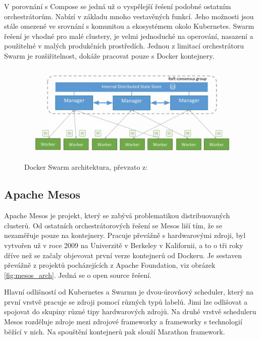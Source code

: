 V porovnání s Compose se jedná už o vyspělejší řešení podobné ostatním orchestrátorům. Nabízí v základu mnoho vestavěných funkcí. Jeho možnosti jsou stále omezené ve srovnání s komunitou a ekosystémem okolo Kubernetes. Swarm řešení je vhodné pro malé clustery, je velmi jednoduché na operování, nasazení a použitelné v malých produkčních prostředích. Jednou z limitací  orchestrátoru Swarm je rozšiřitelnost, dokáže pracovat pouze s Docker kontejnery. 


\begin{figure}[H]
\begin{centering}
\includegraphics[width=1\textwidth]{img/swarm_arch}
\par\end{centering}
\caption{Docker Swarm architektura, převzato z: \cite{swarm_arch} \label{fig:swarm_arch}}
\end{figure}

\subsection{Apache Mesos}
Apache Mesos je projekt, který se zabývá problematikou distribuovaných clusterů. Od ostatních orchestrátorových řešení se Mesos liší tím, že se nezaměřuje pouze na kontejnery. Pracuje převážně s hardwarovými zdroji, byl vytvořen už v roce 2009 na Univerzitě v Berkeley v Kalifornii\cite{mesos}, a to o tři roky dříve než se začaly objevovat první verze kontejnerů od Dockeru. Je sestaven převážně z projektů pocházejících z Apache Foundation, viz obrázek \ref{fig:mesos_arch}. Jedná se o open source řešení.

Hlavní odlišností od Kubernetes a Swarmu je dvou-úrovňový scheduler, který na první vrstvě pracuje se zdroji pomocí různých typů labelů. Jimi lze odlišovat a spojovat do skupiny různé tipy hardwarových zdrojů. Na druhé vrstvě scheduleru Mesos rozděluje zdroje mezi zdrojové frameworky a frameworky s technologií běžící v nich. Na spouštění kontejnerů pak slouží Marathon framework.

